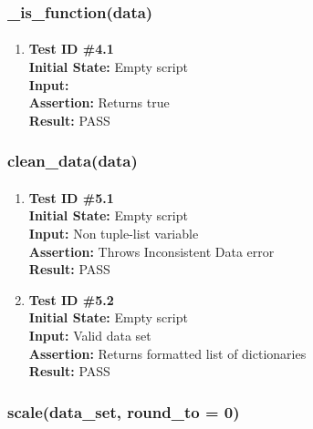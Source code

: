 \documentclass[12pt, titlepage]{article}
\begin{document}
\subsubsection{\_is\_function(data)}		
	\label{sec:4.0.4}
	\paragraph{}
		\begin{enumerate}
			\item{\textbf{Test ID \#4.1\\}}
			\textbf{Initial State:} Empty script\\
			\textbf{Input:}  \\
			\textbf{Assertion:} Returns true \\
			\textbf{Result:} PASS
			

		\end{enumerate}		
		

\subsubsection{clean\_data(data)}		
	\label{sec:4.0.5}
	\paragraph{}
		\begin{enumerate}
			\item{\textbf{Test ID \#5.1\\}}
			\textbf{Initial State:} Empty script\\
			\textbf{Input:} Non tuple-list variable\\
			\textbf{Assertion:} Throws Inconsistent Data error\\
			\textbf{Result:} PASS
			
			\item{\textbf{Test ID \#5.2\\}}
			\textbf{Initial State:} Empty script\\
			\textbf{Input:} Valid data set \\
			\textbf{Assertion:} Returns formatted list of dictionaries\\
			\textbf{Result:} PASS

		\end{enumerate}		

\subsubsection{scale(data\_set, round\_to = 0)}		
	\label{sec:4.0.5}
\end{document}
